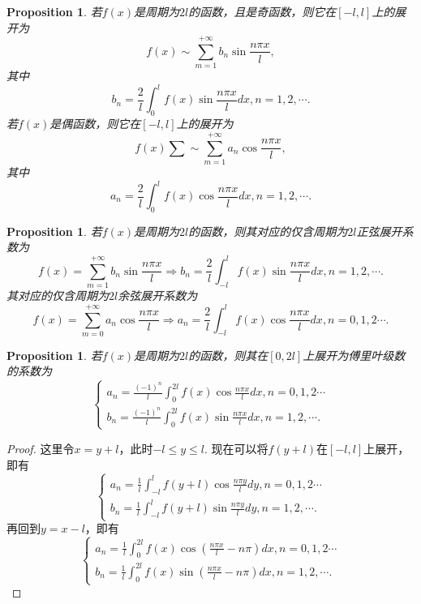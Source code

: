 \documentclass{article}
\newtheorem{proposition}[theorem]{Proposition}
\begin{document}
\begin{proposition}
\rm 若$f(x)$是周期为$2l$的函数，且是奇函数，则它在$[-l,l]$上的展开为
$$
f(x) \sim \sum\limits_{m=1}^{+\infty} b_n \sin \frac{n\pi x}{l},
$$
其中
$$
b_n = \frac{2}{l} \int_{0}^{l} f(x)\sin \frac{n\pi x}{l}dx, n = 1,2,\cdots.
$$
若$f(x)$是偶函数，则它在$[-l,l]$上的展开为
$$
f(x) \sum \sim \sum\limits_{m=1}^{+\infty} a_n \cos \frac{n\pi x}{l},
$$
其中
$$
a_n = \frac{2}{l} \int_{0}^{l} f(x)\cos \frac{n\pi x}{l}dx, n = 1,2,\cdots.
$$
\end{proposition}

\begin{proposition}
\rm 若$f(x)$是周期为$2l$的函数，则其对应的仅含周期为$2l$正弦展开系数为
$$
f(x) = \sum\limits_{m=1}^{+\infty}b_n\sin \frac{n\pi x}{l} \Rightarrow b_n = \frac{2}{l} \int_{-l}^{l} f(x)\sin \frac{n\pi x}{l} dx,n = 1,2,\cdots.
$$
其对应的仅含周期为$2l$余弦展开系数为
$$
f(x) = \sum\limits_{m=0}^{+\infty}a_n\cos\frac{n\pi x}{l} \Rightarrow a_n = \frac{2}{l} \int_{-l}^{l} f(x)\cos \frac{n\pi x}{l} dx, n = 0,1,2\cdots. 
$$
\end{proposition}

\begin{proposition}
\rm 若$f(x)$是周期为$2l$的函数，则其在$[0,2l]$上展开为傅里叶级数的系数为
$$
\left\{
\begin{array}{ll}
a_n = \frac{(-1)^n}{l} \int_{0}^{2l} f(x)\cos \frac{n\pi x}{l}dx, n =  0,1,2 \cdots \\
b_n = \frac{(-1)^n}{l} \int_{0}^{2l} f(x)\sin \frac{n\pi x}{l}dx, n = 1,2,\cdots.
\end{array} \right.
$$
\end{proposition}

\begin{proof}
这里令$x=y+l$，此时$-l \leq y \leq l$. 现在可以将$f(y+l)$在$[-l,l]$上展开，即有
$$
\left\{
\begin{array}{ll}
a_n = \frac{1}{l} \int_{-l}^{l} f\left(y+l\right)\cos \frac{n\pi y}{l}dy, n =  0,1,2\cdots \\
b_n = \frac{1}{l} \int_{-l}^{l} f\left(y+l\right)\sin \frac{n\pi y}{l}dy, n = 1,2,\cdots.
\end{array} \right.
$$
再回到$y = x-l$，即有
$$
\left\{
\begin{array}{ll}
a_n = \frac{1}{l} \int_{0}^{2l} f(x) \cos (\frac{n\pi x}{l}-n\pi) dx, n =  0,1,2\cdots \\
b_n = \frac{1}{l} \int_{0}^{2l} f(x) \sin (\frac{n\pi x}{l}-n\pi) dx, n = 1,2,\cdots.
\end{array} \right.
$$
\end{proof}
\end{document}
